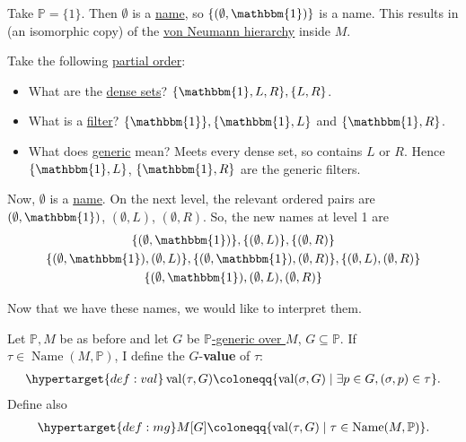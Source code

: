 \documentclass{article}
\newcommand{\named}[1]{\textbf{#1}\index{#1}}
\newcommand{\1}{\mathbbm{1}}
\DeclareMathOperator{\name}{Name}
\DeclareMathOperator{\val}{val}
\begin{document}
\begin{eg}
  Take $\mathbb{P} = \{1\}$.
  Then $\emptyset$ is a \hyperlink{def:name}{name}, so $\{(\emptyset,\mathbbm{1})\}$ is a name.
  This results in (an isomorphic copy) of the \hyperlink{def:vk}{von Neumann hierarchy} inside $M$.
\end{eg}
\begin{eg}
  Take the following \hyperlink{def:poset}{partial order}:
  \begin{center}
  \end{center}
  \begin{itemize}
    \item What are the \hyperlink{def:dense}{dense sets}? $\{\mathbbm{1},L,R\}, \{L,R\}$.
    \item What is a \hyperlink{def:filter}{filter}? $\{\mathbbm{1}\}, \{\mathbbm{1},L\}$ and $\{\mathbbm{1},R\}$.
    \item What does \hyperlink{def:genericO}{generic} mean? Meets every dense set, so contains $L$ or $R$. Hence $\{\mathbbm{1},L\}$, $\{\mathbbm{1},R\}$ are the generic filters.
  \end{itemize}
  Now, $\emptyset$ is a \hyperlink{def:name}{name}.
  On the next level, the relevant ordered pairs are $(\emptyset, \mathbbm{1})$, $(\emptyset, L)$, $(\emptyset,R)$.
  So, the new names at level 1 are
  \begin{gather*}
    \{(\emptyset,\1)\}, \{(\emptyset,L)\}, \{(\emptyset,R)\} \\
    \{(\emptyset,\1), (\emptyset,L)\}, \{(\emptyset,\1), (\emptyset,R)\}, \{(\emptyset,L), (\emptyset,R)\} \\
    \{(\emptyset,\1), (\emptyset,L), (\emptyset,R)\}
  \end{gather*}
\end{eg}

Now that we have these names, we would like to interpret them.
\begin{defi}
  Let $\mathbb{P}, M$ be as before and let $G$ be \hyperlink{def:genericO}{$\mathbb{P}$-generic over $M$}, $G \subseteq \mathbb{P}$.
  If $\tau \in \name(M,\mathbb{P})$, I define the $G$-\named{value} of $\tau$:
  \begin{align*}
    \hypertarget{def:val}\val(\tau,G) \coloneqq \{\val(\sigma,G) \mid \exists p \in G, (\sigma,p) \in \tau\}.
  \end{align*}
  Define also
  \begin{align*}
    \hypertarget{def:mg}M[G] \coloneqq \{\val(\tau,G) \mid \tau \in \name(M,\mathbb{P})\}.
  \end{align*}
\end{defi}
\end{document}
